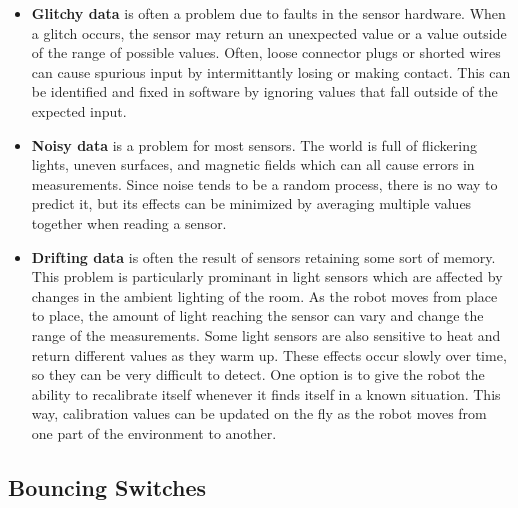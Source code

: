 \begin{itemize}

 \item {\bf Glitchy data} is often a problem due to faults in the
 sensor hardware. When a glitch occurs, the sensor may return an
 unexpected value or a value outside of the range of possible
 values. Often, loose connector plugs or shorted wires can cause
 spurious input by intermittantly losing or making contact. This can
 be identified and fixed in software by ignoring values that fall
 outside of the expected input.

 \item {\bf Noisy data} is a problem for most sensors. The world is
 full of flickering lights, uneven surfaces, and magnetic fields which
 can all cause errors in measurements. Since noise tends to be a
 random process, there is no way to predict it, but its effects can be
 minimized by averaging multiple values together when reading a
 sensor.

 \item {\bf Drifting data} is often the result of sensors retaining
 some sort of memory. This problem is particularly prominant in light
 sensors which are affected by changes in the ambient lighting of the
 room. As the robot moves from place to place, the amount of light
 reaching the sensor can vary and change the range of the
 measurements. Some light sensors are also sensitive to heat and
 return different values as they warm up. These effects occur slowly
 over time, so they can be very difficult to detect. One option is to
 give the robot the ability to recalibrate itself whenever it finds
 itself in a known situation. This way, calibration values can be
 updated on the fly as the robot moves from one part of the
 environment to another.

\end{itemize}

\subsection{Bouncing Switches}

